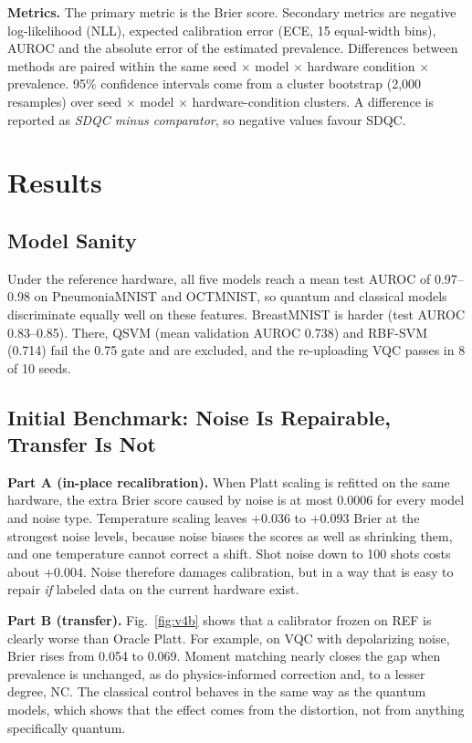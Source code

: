 \documentclass[conference]{IEEEtran}
\begin{document}
\textbf{Metrics.} The primary metric is the Brier score. Secondary metrics are negative log-likelihood (NLL), expected calibration error (ECE, 15 equal-width bins), AUROC and the absolute error of the estimated prevalence. Differences between methods are paired within the same seed $\times$ model $\times$ hardware condition $\times$ prevalence. 95\% confidence intervals come from a cluster bootstrap (2,000 resamples) over seed $\times$ model $\times$ hardware-condition clusters. A difference is reported as \emph{SDQC minus comparator}, so negative values favour SDQC.

\section{Results}

\subsection{Model Sanity}

Under the reference hardware, all five models reach a mean test AUROC of 0.97--0.98 on PneumoniaMNIST and OCTMNIST, so quantum and classical models discriminate equally well on these features. BreastMNIST is harder (test AUROC 0.83--0.85). There, QSVM (mean validation AUROC 0.738) and RBF-SVM (0.714) fail the 0.75 gate and are excluded, and the re-uploading VQC passes in 8 of 10 seeds.

\subsection{Initial Benchmark: Noise Is Repairable, Transfer Is Not}

\textbf{Part A (in-place recalibration).} When Platt scaling is refitted on the same hardware, the extra Brier score caused by noise is at most $0.0006$ for every model and noise type. Temperature scaling leaves $+0.036$ to $+0.093$ Brier at the strongest noise levels, because noise biases the scores as well as shrinking them, and one temperature cannot correct a shift. Shot noise down to 100 shots costs about $+0.004$. Noise therefore damages calibration, but in a way that is easy to repair \emph{if} labeled data on the current hardware exist.

\textbf{Part B (transfer).} Fig.~\ref{fig:v4b} shows that a calibrator frozen on REF is clearly worse than Oracle Platt. For example, on VQC with depolarizing noise, Brier rises from 0.054 to 0.069. Moment matching nearly closes the gap when prevalence is unchanged, as do physics-informed correction and, to a lesser degree, NC. The classical control behaves in the same way as the quantum models, which shows that the effect comes from the distortion, not from anything specifically quantum.
\end{document}
